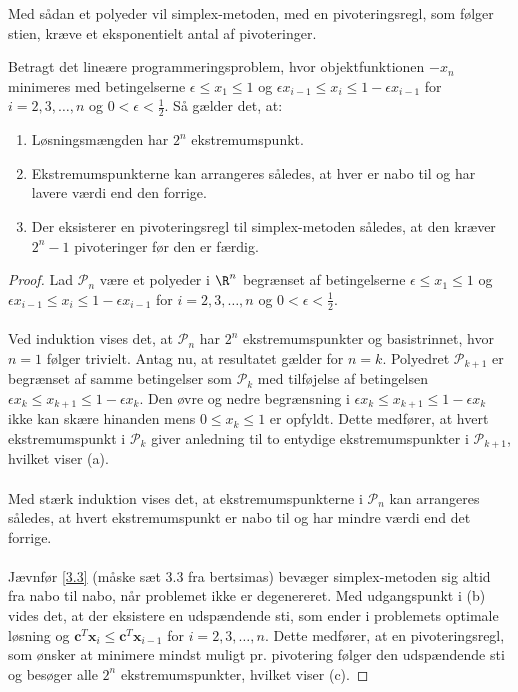 Med sådan et polyeder vil simplex-metoden, med en pivoteringsregl, som følger stien, kræve et eksponentielt antal af pivoteringer.
%
\begin{thm}{}{}
Betragt det lineære programmeringsproblem, hvor objektfunktionen $-x_n$ minimeres med betingelserne $\epsilon \leq x_1 \leq 1$ og $\epsilon x_{i-1} \leq x_i \leq 1 - \epsilon x_{i-1}$ for $i = 2, 3, \ldots, n$ og $0 < \epsilon < \frac{1}{2}$.
Så gælder det, at:
%
\begin{enumerate}[label=(\alph*)]
\item Løsningsmængden har $2^n$ ekstremumspunkt.
\item Ekstremumspunkterne kan arrangeres således, at hver er nabo til og har lavere værdi end den forrige.
\item Der eksisterer en pivoteringsregl til simplex-metoden således, at den kræver $2^n-1$ pivoteringer før den er færdig.
\end{enumerate}
%
\end{thm}
%
\begin{proof}
%
Lad $\mathcal{P}_n$ være et polyeder i $\R^n$ begrænset af betingelserne $\epsilon \leq x_1 \leq 1$ og $\epsilon x_{i-1} \leq x_i \leq 1 - \epsilon x_{i-1}$ for $i = 2, 3, \ldots, n$ og $0 < \epsilon < \frac{1}{2}$.\\\\
%
Ved induktion vises det, at $\mathcal{P}_n$ har $2^n$ ekstremumspunkter og basistrinnet, hvor $n=1$ følger trivielt.
Antag nu, at resultatet gælder for $n=k$.
Polyedret $\mathcal{P}_{k+1}$ er begrænset af samme betingelser som $\mathcal{P}_{k}$ med tilføjelse af betingelsen $\epsilon x_{k} \leq x_{k+1} \leq 1 - \epsilon x_{k}$.
Den øvre og nedre begrænsning i $\epsilon x_{k} \leq x_{k+1} \leq 1 - \epsilon x_{k}$ ikke kan skære hinanden mens $ 0 \leq x_k \leq 1$ er opfyldt.
Dette medfører, at hvert ekstremumspunkt i $\mathcal{P}_{k}$ giver anledning til to entydige ekstremumspunkter i $\mathcal{P}_{k+1}$, hvilket viser (a).\\\\
%
Med stærk induktion vises det, at ekstremumspunkterne i  $\mathcal{P}_n$ kan arrangeres således, at hvert ekstremumspunkt er nabo til og har mindre værdi end det forrige.
%
\\\\
Jævnfør \ref{3.3} (måske sæt 3.3 fra bertsimas) bevæger simplex-metoden sig altid fra nabo til nabo, når problemet ikke er degenereret.
Med udgangspunkt i (b) vides det, at der eksistere en udspændende sti, som ender i problemets optimale løsning og $\textbf{c}^T\textbf{x}_i \leq \textbf{c}^T\textbf{x}_{i-1}$ for $i = 2, 3, \ldots ,n$.
Dette medfører, at en pivoteringsregl, som ønsker at minimere mindst muligt pr. pivotering følger den udspændende sti og besøger alle $2^n$ ekstremumspunkter, hvilket viser (c).
\end{proof}